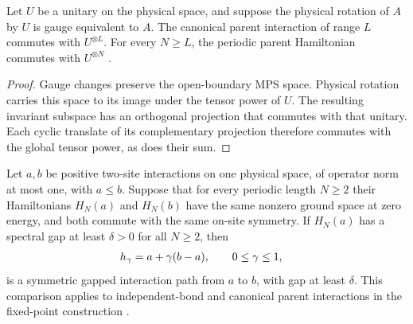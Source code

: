 \begin{lemma}
    \label{thm:spt_parent_hamiltonian_symmetry}
    \leanok
    Let $U$ be a unitary on the physical space, and suppose the physical
    rotation of $A$ by $U$ is gauge equivalent to $A$.  The canonical
    parent interaction of range $L$ commutes with $U^{\otimes L}$.
    For every $N\geq L$, the periodic parent Hamiltonian commutes
    with $U^{\otimes N}$ \cite[Section~II.F.2]{Schuch2011Phases}.
\end{lemma}

\begin{proof}\leanok
    Gauge changes preserve the open-boundary MPS space.  Physical rotation
    carries this space to its image under the tensor power of $U$.
    The resulting invariant subspace has an orthogonal projection that
    commutes with that unitary.  Each cyclic translate of its complementary
    projection therefore commutes with the global tensor power, as does
    their sum.
\end{proof}

\begin{definition}
    \label{def:spt_ordered_interaction_path}
    \leanok
    Let $a,b$ be positive two-site interactions on one physical space,
    of operator norm at most one, with $a\leq b$. Suppose that for every
    periodic length $N\geq2$ their Hamiltonians $H_N(a)$ and $H_N(b)$
    have the same nonzero ground space at zero energy, and both commute
    with the same on-site symmetry. If $H_N(a)$ has a spectral gap
    at least $\delta>0$ for all $N\geq2$, then
    \begin{align}
        h_\gamma & =a+\gamma(b-a), \qquad 0\leq\gamma\leq1,
        \notag
    \end{align}
    is a symmetric gapped interaction path from $a$ to $b$, with gap
    at least $\delta$. This comparison applies to independent-bond and
    canonical parent interactions in the fixed-point construction
    \cite[Section~II.F.2]{Schuch2011Phases}.
\end{definition}

